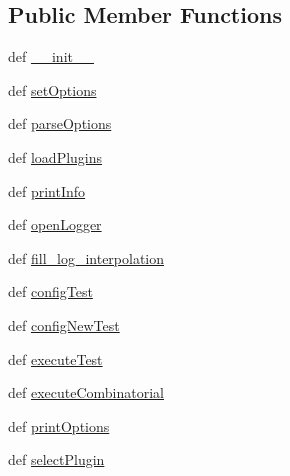\subsection*{Public Member Functions}
\begin{DoxyCompactItemize}
\item 
def \hyperlink{classTestDef_1_1TestDef_a8726684b78fbeb50a85915c6ff70050a}{\-\_\-\-\_\-init\-\_\-\-\_\-}
\item 
def \hyperlink{classTestDef_1_1TestDef_a65ffa863be5ebac4c4e6789e60377311}{set\-Options}
\item 
def \hyperlink{classTestDef_1_1TestDef_a35094bb7b74996ba7536ba5ec4df516b}{parse\-Options}
\item 
def \hyperlink{classTestDef_1_1TestDef_ae25d1dd3e674e2b0c2b1970e653ecfec}{load\-Plugins}
\item 
def \hyperlink{classTestDef_1_1TestDef_a8181c40f19ab55c7ba356d42c2fbbe5b}{print\-Info}
\item 
def \hyperlink{classTestDef_1_1TestDef_a3685bd47cb3be226c09d6737107dba04}{open\-Logger}
\item 
def \hyperlink{classTestDef_1_1TestDef_a1eef52449af7cd41049963ccbd8699c8}{fill\-\_\-log\-\_\-interpolation}
\item 
def \hyperlink{classTestDef_1_1TestDef_a2a10cd354fb5b287a8e6fa8a2d5e1915}{config\-Test}
\item 
def \hyperlink{classTestDef_1_1TestDef_a480ed48dbd7cf34cb2cbd8219999aaad}{config\-New\-Test}
\item 
def \hyperlink{classTestDef_1_1TestDef_a3eeef61386a154552981676b1893e59e}{execute\-Test}
\item 
def \hyperlink{classTestDef_1_1TestDef_a052b17251fd618f9a98197bcf9805511}{execute\-Combinatorial}
\item 
def \hyperlink{classTestDef_1_1TestDef_a02bd5283e28743c874846f1c4c6bdf08}{print\-Options}
\item 
def \hyperlink{classTestDef_1_1TestDef_a2b517830435062cfa6c859ddce85ea81}{select\-Plugin}
\end{DoxyCompactItemize}
